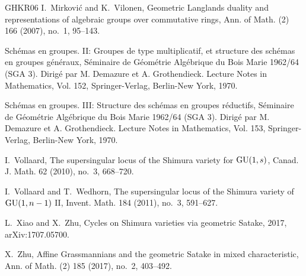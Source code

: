 \begin{thebibliography}{GHKR06}
	I.~Mirkovi\'{c} and K.~Vilonen, Geometric {L}anglands duality and
	representations of algebraic groups over commutative rings, Ann. of Math. (2)
	166 (2007), no.~1, 95--143.
	
	Sch\'{e}mas en groupes. {II}: {G}roupes de type multiplicatif, et structure des
	sch\'{e}mas en groupes g\'{e}n\'{e}raux, S\'{e}minaire de G\'{e}om\'{e}trie
	Alg\'{e}brique du Bois Marie 1962/64 (SGA 3). Dirig\'{e} par M. Demazure et
	A. Grothendieck. Lecture Notes in Mathematics, Vol. 152, Springer-Verlag,
	Berlin-New York, 1970.
	
	Sch\'emas en groupes. {III}: {S}tructure des sch\'emas en groupes r\'eductifs,
	S\'eminaire de G\'eom\'etrie Alg\'ebrique du Bois Marie 1962/64 (SGA 3).
	Dirig\'e par M. Demazure et A. Grothendieck. Lecture Notes in Mathematics,
	Vol. 153, Springer-Verlag, Berlin-New York, 1970.
	
	I.~Vollaard, The supersingular locus of the {S}himura variety for {${\rm
			GU}(1,s)$}, Canad. J. Math. 62 (2010), no.~3, 668--720.
	
	I.~Vollaard and T.~Wedhorn, The supersingular locus of the {S}himura variety of
	{${\rm GU}(1,n-1)$} {II}, Invent. Math. 184 (2011), no.~3, 591--627.
	
	L.~Xiao and X.~Zhu, Cycles on Shimura varieties via geometric Satake, 2017,
	arXiv:1707.05700.
	
	X.~Zhu, Affine {G}rassmannians and the geometric {S}atake in mixed
	characteristic, Ann. of Math. (2) 185 (2017), no.~2, 403--492.
	
\end{thebibliography}
